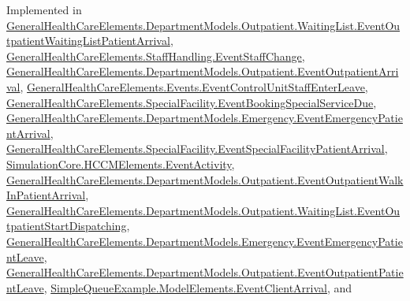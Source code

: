 Implemented in \hyperlink{class_general_health_care_elements_1_1_department_models_1_1_outpatient_1_1_waiting_list_1_1_eveb69cba3dbb99690008a282b7e42002d2_a8897f9f45cfaa9405a3167954b04339e}{General\+Health\+Care\+Elements.\+Department\+Models.\+Outpatient.\+Waiting\+List.\+Event\+Outpatient\+Waiting\+List\+Patient\+Arrival}, \hyperlink{class_general_health_care_elements_1_1_staff_handling_1_1_event_staff_change_a90449700d2d66c81b6d3db91010dae9a}{General\+Health\+Care\+Elements.\+Staff\+Handling.\+Event\+Staff\+Change}, \hyperlink{class_general_health_care_elements_1_1_department_models_1_1_outpatient_1_1_event_outpatient_arrival_a0a434fb9042926866a2c52cec87cb4dc}{General\+Health\+Care\+Elements.\+Department\+Models.\+Outpatient.\+Event\+Outpatient\+Arrival}, \hyperlink{class_general_health_care_elements_1_1_events_1_1_event_control_unit_staff_enter_leave_a3d7634f456bb34a226ee1d2a7fce129a}{General\+Health\+Care\+Elements.\+Events.\+Event\+Control\+Unit\+Staff\+Enter\+Leave}, \hyperlink{class_general_health_care_elements_1_1_special_facility_1_1_event_booking_special_service_due_ad2c68f09938f133f26095c68376fb39d}{General\+Health\+Care\+Elements.\+Special\+Facility.\+Event\+Booking\+Special\+Service\+Due}, \hyperlink{class_general_health_care_elements_1_1_department_models_1_1_emergency_1_1_event_emergency_patient_arrival_adc54538f08106162d8db93d18860737e}{General\+Health\+Care\+Elements.\+Department\+Models.\+Emergency.\+Event\+Emergency\+Patient\+Arrival}, \hyperlink{class_general_health_care_elements_1_1_special_facility_1_1_event_special_facility_patient_arrival_a285dee6544a66a6aaddde2e7043e9ef0}{General\+Health\+Care\+Elements.\+Special\+Facility.\+Event\+Special\+Facility\+Patient\+Arrival}, \hyperlink{class_simulation_core_1_1_h_c_c_m_elements_1_1_event_activity_ae6ebe43efa000c4dd8a74b5d39d4ef30}{Simulation\+Core.\+H\+C\+C\+M\+Elements.\+Event\+Activity}, \hyperlink{class_general_health_care_elements_1_1_department_models_1_1_outpatient_1_1_event_outpatient_walk_in_patient_arrival_a404d473cb84d6bad14a94955aaf5f517}{General\+Health\+Care\+Elements.\+Department\+Models.\+Outpatient.\+Event\+Outpatient\+Walk\+In\+Patient\+Arrival}, \hyperlink{class_general_health_care_elements_1_1_department_models_1_1_outpatient_1_1_waiting_list_1_1_event_outpatient_start_dispatching_aad8feeb4160a1354d57350b8a290abe3}{General\+Health\+Care\+Elements.\+Department\+Models.\+Outpatient.\+Waiting\+List.\+Event\+Outpatient\+Start\+Dispatching}, \hyperlink{class_general_health_care_elements_1_1_department_models_1_1_emergency_1_1_event_emergency_patient_leave_ac3b3bf1ebc3e6bf99ce4b3168f70489e}{General\+Health\+Care\+Elements.\+Department\+Models.\+Emergency.\+Event\+Emergency\+Patient\+Leave}, \hyperlink{class_general_health_care_elements_1_1_department_models_1_1_outpatient_1_1_event_outpatient_patient_leave_aa1fe02e30837e14823abc3e2232fff3e}{General\+Health\+Care\+Elements.\+Department\+Models.\+Outpatient.\+Event\+Outpatient\+Patient\+Leave}, \hyperlink{class_simple_queue_example_1_1_model_elements_1_1_event_client_arrival_a4e065624f704a12288a0cae66c166a0a}{Simple\+Queue\+Example.\+Model\+Elements.\+Event\+Client\+Arrival}, and 